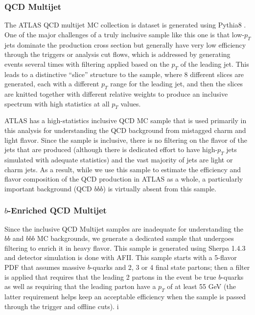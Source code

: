 \subsubsection{QCD Multijet}
The ATLAS QCD multijet MC collection is dataset is generated using Pythia8 \cite{Pythia8}.  One of the major challenges of a truly inclusive sample like this one is that low-$p_T$ jets dominate the production cross section but generally have very low efficiency through the triggers or analysis cut flows, which is addressed by generating events several times with filtering applied based on the $p_T$ of the leading jet.  This leads to a distinctive ``slice'' structure to the sample, where 8 different slices are generated, each with a different $p_T$ range for the leading jet, and then the slices are knitted together with different relative weights to produce an inclusive spectrum with high statistics at all $p_T$ values.  


ATLAS has a high-statistics inclusive QCD MC sample that is used primarily in this analysis for understanding the QCD background from mistagged charm and light flavor.  Since the sample is inclusive, there is no filtering on the flavor of the jets that are produced (although there is dedicated effort to have high-$p_T$ jets simulated with adequate statistics) and the vast majority of jets are light or charm jets.  As a result, while we use this sample to estimate the efficiency and flavor composition of the QCD production in ATLAS as a whole, a particularly important background (QCD $bbb$) is virtually absent from this sample.


\subsubsection{$b$-Enriched QCD Multijet}
\label{sec:bb_qcd_mc}
Since the inclusive QCD Multijet samples are inadequate for understanding the $bb$ and $bbb$ MC backgrounds, we generate a dedicated sample that undergoes filtering to enrich it in heavy flavor.  This sample is generated using Sherpa 1.4.3 \cite{Sherpa} and detector simulation is done with AFII.  This sample starts with a 5-flavor PDF that assumes massive $b$-quarks and 2, 3 or 4 final state partons; then a filter is applied that requires that the leading 2 partons in the event be true $b$-quarks as well as requiring that the leading parton have a $p_T$ of at least 55 GeV (the latter requirement helps keep an acceptable efficiency when the sample is passed through the trigger and offline cuts).
i

